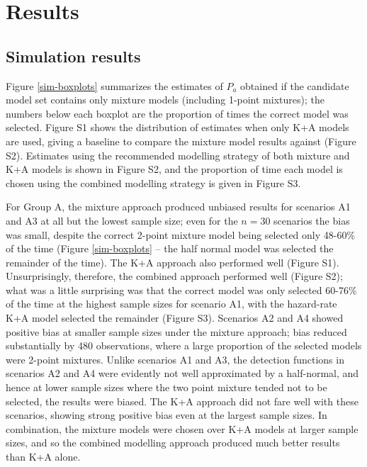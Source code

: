 \documentclass[10pt]{article}
\begin{document}
  
\section*{Results}

\subsection*{Simulation results}

Figure \ref{sim-boxplots} summarizes the estimates of $P_a$ obtained if the candidate model set contains only mixture models (including 1-point mixtures); the numbers below each boxplot are the proportion of times the correct model was selected. Figure S1 shows the distribution of estimates when only K+A models are used, giving a baseline to compare the mixture model results against (Figure S2). Estimates using the recommended modelling strategy of both mixture and K+A models is shown in Figure S2, and the proportion of time each model is chosen using the combined modelling strategy is given in Figure S3.

For Group A, the mixture approach produced unbiased results for scenarios A1 and A3 at all but the lowest sample size; even for the $n=30$ scenarios the bias was small, despite the correct 2-point mixture model being selected only 48-60\% of the time (Figure \ref{sim-boxplots} -- the half normal model was selected the remainder of the time).  The K+A approach also performed well (Figure S1). Unsurprisingly, therefore, the combined approach performed well (Figure S2); what was a little surprising was that the correct model was only selected 60-76\% of the time at the highest sample sizes for scenario A1, with the hazard-rate K+A model selected the remainder (Figure S3). Scenarios A2 and A4 showed positive bias at smaller sample sizes under the mixture approach; bias reduced substantially by 480 observations, where a large proportion of the selected models were 2-point mixtures. Unlike scenarios A1 and A3, the detection functions in scenarios A2 and A4 were evidently not well approximated by a half-normal, and hence at lower sample sizes where the two point mixture tended not to be selected, the results were biased. The K+A approach did not fare well with these scenarios, showing strong positive bias even at the largest sample sizes. In combination, the mixture models were chosen over K+A models at larger sample sizes, and so the combined modelling approach produced much better results than K+A alone.  
\end{document}
